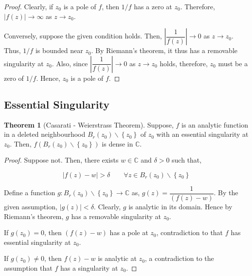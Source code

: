 \documentclass[12pt]{article}
\newcommand{\C}{\mathbb{C}}
\theoremstyle{definition}
\newtheorem{thm}{Theorem}
\newenvironment{theorem}{
\begin{tcolorbox}[colback=green!5!white,colframe=green!75!black, parbox = false]\begin{thm} }{\end{thm}\end{tcolorbox} }
\begin{document}
\begin{proof}
    Clearly, if $z_0$ is a pole of $f$, then $1/f$ has a zero at $z_0$. Therefore, $\vert f(z) \vert \rightarrow \infty$ as $z \rightarrow z_0$.

    Conversely, suppose the given condition holds. Then, $\left\vert \dfrac{1}{f(z)} \right\vert \rightarrow 0$ as $z \rightarrow z_0$. Thus, $1/f$ is bounded near $z_0$. By Riemann's theorem, it thus has a removable singularity at $z_0$. Also, since $\left\vert \dfrac{1}{f(z)} \right\vert \rightarrow 0$ as $z \rightarrow z_0$ holds, therefore, $z_0$ must be a zero of $1/f$. Hence, $z_0$ is a pole of $f$.
\end{proof}


\subsection{Essential Singularity}

\begin{theorem}[Casarati - Weierstrass Theorem]
    Suppose, $f$ is an analytic function in a deleted neighbourhood $B_r(z_0) \backslash \left\{ z_0 \right\}$ of $z_0$ with an essential singularity at $z_0$. Then, $f\left( B_r(z_0) \backslash \left\{ z_0 \right\} \right)$ is dense in $\C$.
\end{theorem}

\begin{proof}
    Suppose not. Then, there exists $w \in \C$ and $\delta > 0$ such that, 

    $$
    \vert f(z) - w \vert > \delta \qquad \forall z \in B_r(z_0) \backslash \left\{ z_0 \right\}
    $$

    Define a function $g : B_r(z_0) \backslash \left\{ z_0 \right\} \rightarrow \C$ as, $g(z) = \dfrac{1}{(f(z) - w)}$. By the given assumption, $\vert g(z)\vert < \delta$. Clearly, $g$ is analytic in its domain. Hence by Riemann's theorem, $g$ has a removable singularity at $z_0$.

    If $g(z_0) = 0$, then $(f(z) - w)$ has a pole at $z_0$, contradiction to that $f$ has essential singularity at $z_0$.

    If $g(z_0) \neq 0$, then $f(z) - w$ is analytic at $z_0$, a contradiction to the assumption that $f$ has a singularity at $z_0$.
\end{proof}
\end{document}
